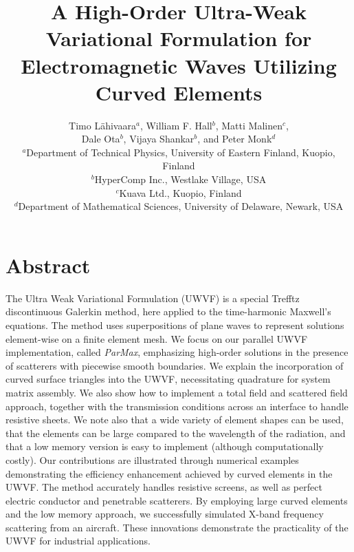 \documentclass[a4paper,12pt]{article}
\begin{document}
\title{A High-Order Ultra-Weak Variational Formulation for Electromagnetic Waves Utilizing Curved Elements}

\author{Timo L\"ahivaara${}^{a}$, William F. Hall${}^{b}$, Matti Malinen${}^{c}$,\\ Dale Ota${}^{b}$, Vijaya Shankar${}^{b}$, and Peter Monk${}^{d}$\\
\normalsize ${}^{a}$Department of Technical Physics, University of Eastern Finland, Kuopio, Finland\\
\normalsize ${}^{b}$HyperComp Inc., Westlake Village, USA\\
\normalsize ${}^{c}$Kuava Ltd., Kuopio, Finland\\
\normalsize ${}^{d}$Department of Mathematical Sciences, University of Delaware, Newark, USA
}

\maketitle


\section*{Abstract}

The Ultra Weak Variational Formulation (UWVF) is a special Trefftz
discontinuous Galerkin method, here applied to the time-harmonic
Maxwell’s equations.  The method uses superpositions of plane waves to
represent solutions element-wise on a finite element mesh. We focus on
our parallel UWVF implementation, called \emph{ParMax}, emphasizing
high-order solutions in the presence of scatterers with piecewise
smooth boundaries. We explain the incorporation of curved surface
triangles into the UWVF, necessitating quadrature for system matrix
assembly. We also show how to implement a total field and scattered
field approach, together with the transmission conditions across an
interface to handle resistive sheets.  We note also that a wide
variety of element shapes can be used, that the elements can be large
compared to the wavelength of the radiation, and that a low memory
version is easy to implement (although computationally costly). Our
contributions are illustrated through numerical examples demonstrating
the efficiency enhancement achieved by curved elements in the
UWVF. The method accurately handles resistive screens, as well as
perfect electric conductor and penetrable scatterers. By employing
large curved elements and the low memory approach, we successfully
simulated X-band frequency scattering from an aircraft. These
innovations demonstrate the practicality of the UWVF for industrial
applications.
\end{document}
